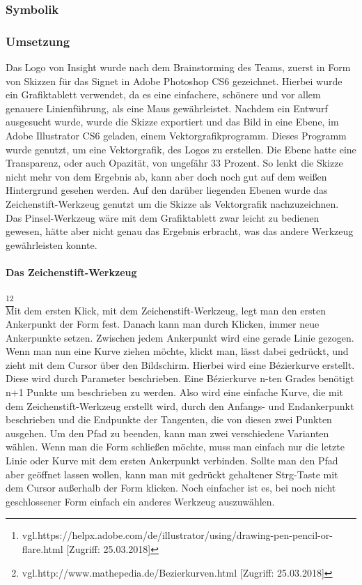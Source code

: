 \subsubsection{Symbolik}
\subsubsection{Umsetzung}
Das Logo von Insight wurde nach dem Brainstorming des Teams, zuerst in Form von Skizzen für das Signet in Adobe Photoshop CS6 gezeichnet. Hierbei wurde ein Grafiktablett verwendet, da es eine einfachere, schönere und vor allem genauere Linienführung, als eine Maus gewährleistet.
Nachdem ein Entwurf ausgesucht wurde, wurde die Skizze exportiert und das Bild in eine Ebene, im Adobe Illustrator CS6 geladen, einem Vektorgrafikprogramm. Dieses Programm wurde genutzt, um eine Vektorgrafik, des Logos zu erstellen. Die Ebene hatte eine Transparenz, oder auch Opazität, von ungefähr 33 Prozent. So lenkt die Skizze nicht mehr von dem Ergebnis ab, kann aber doch noch gut auf dem weißen Hintergrund gesehen werden. Auf den darüber liegenden Ebenen wurde das Zeichenstift-Werkzeug genutzt um die Skizze als Vektorgrafik nachzuzeichnen. Das Pinsel-Werkzeug wäre mit dem Grafiktablett zwar leicht zu bedienen gewesen, hätte aber nicht genau das Ergebnis erbracht, was das andere Werkzeug gewährleisten konnte.
\leavevmode \\

\paragraph{Das Zeichenstift-Werkzeug}
\footnote{\label{} vgl.https://helpx.adobe.com/de/illustrator/using/drawing-pen-pencil-or-flare.html	[Zugriff: 25.03.2018]}\footnote{\label{} vgl.http://www.mathepedia.de/Bezierkurven.html [Zugriff: 25.03.2018]}
\leavevmode \\
Mit dem ersten Klick, mit dem Zeichenstift-Werkzeug, legt man den ersten Ankerpunkt der Form fest. Danach kann man durch Klicken, immer neue Ankerpunkte setzen. Zwischen jedem Ankerpunkt wird eine gerade Linie gezogen. Wenn man nun eine Kurve ziehen möchte, klickt man, lässt dabei gedrückt, und zieht mit dem Cursor über den Bildschirm. Hierbei wird eine Bézierkurve erstellt. Diese wird durch Parameter beschrieben. Eine Bézierkurve n-ten Grades benötigt n+1 Punkte um beschrieben zu werden. Also wird eine einfache Kurve, die mit dem Zeichenstift-Werkzeug erstellt wird, durch den Anfangs- und Endankerpunkt beschrieben und die Endpunkte der Tangenten, die von diesen zwei Punkten ausgehen. Um den Pfad zu beenden, kann man zwei verschiedene Varianten wählen. Wenn man die Form schließen möchte, muss man einfach nur die letzte Linie oder Kurve mit dem ersten Ankerpunkt verbinden. Sollte man den Pfad aber geöffnet lassen wollen, kann man mit gedrückt gehaltener Strg-Taste mit dem Cursor außerhalb der Form klicken. Noch einfacher ist es, bei noch nicht geschlossener Form einfach ein anderes Werkzeug auszuwählen.
\leavevmode \\

